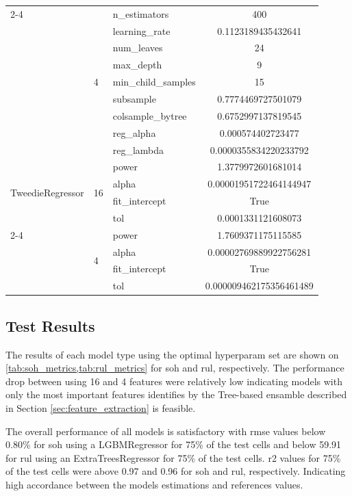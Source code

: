 \begin{table}[p]
{\begin{tabular}{lllc}
    \cmidrule(l){2-4}
    & \multirow{9}{*}{\num{4}} & n\_estimators & \num{400} \\
    & & learning\_rate & \num{0.1123189435432641} \\
    & & num\_leaves & \num{24} \\
    & & max\_depth & \num{9} \\
    & & min\_child\_samples & \num{15} \\
    & & subsample & \num{0.7774469727501079} \\
    & & colsample\_bytree & \num{0.6752997137819545} \\
    & & reg\_alpha & \num{0.000574402723477} \\
    & & reg\_lambda & \num{0.0000355834220233792} \\
    \midrule
    \multirow{4}{*}{TweedieRegressor} & \multirow{4}{*}{\num{16}} & power & \num{1.3779972601681014} \\
    & & alpha & \num{0.00001951722464144947} \\
    & & fit\_intercept & True \\
    & & tol & \num{0.0001331121608073} \\
    \cmidrule(l){2-4}
    & \multirow{4}{*}{\num{4}} & power & \num{1.7609371175115585} \\
    & & alpha & \num{0.00002769889922756281} \\
    & & fit\_intercept & True \\
    & & tol & \num{0.000009462175356461489} \\
    \bottomrule
    \end{tabular}
    }
\end{table}

\subsection{Test Results}

The results of each model type using the optimal hyperparam set are shown on \cref{tab:soh_metrics,tab:rul_metrics} for \ac{soh} and \ac{rul}, respectively. The performance drop between using 16 and 4 features were relatively low indicating models with only the most important features identifies by the Tree-based ensamble described in Section \ref{sec:feature_extraction} is feasible.

The overall performance of all models is satisfactory with \ac{rmse} values below 0.80\% for \ac{soh} using a LGBMRegressor for 75\% of the test cells and below 59.91 for \ac{rul} using an ExtraTreesRegressor for 75\% of the test cells. \ac{r2} values for 75\% of the test cells were above 0.97 and 0.96 for \ac{soh} and \ac{rul}, respectively. Indicating high accordance between the models estimations and references values.

